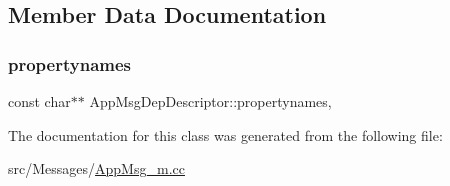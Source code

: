 \subsection{Member Data Documentation}
\mbox{\label{classAppMsgDepDescriptor_a03578bf1418ef896a9abfcded857b728}} 
\subsubsection{\texorpdfstring{propertynames}{propertynames}}
{\footnotesize\ttfamily const char$\ast$$\ast$ App\+Msg\+Dep\+Descriptor\+::propertynames\hspace{0.3cm}{\ttfamily [mutable]}, {\ttfamily [private]}}



The documentation for this class was generated from the following file\+:\begin{DoxyCompactItemize}
\item 
src/\+Messages/\hyperlink{AppMsg__m_8cc}{App\+Msg\+\_\+m.\+cc}\end{DoxyCompactItemize}
